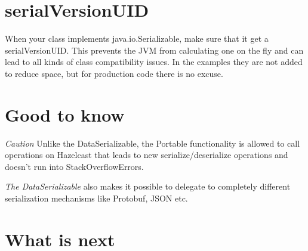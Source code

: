 \section{serialVersionUID} 
When your class implements java.io.Serializable, make sure that it get a serialVersionUID. This prevents the JVM from calculating one on the fly and can lead to all kinds of class compatibility issues. In the examples they are not added to reduce space, but for production code there is no excuse.

\section{Good to know}

\emph{Caution}  Unlike the DataSerializable, the Portable functionality is allowed to call operations on Hazelcast that leads to new serialize/deserialize operations and doesn't run into StackOverflowErrors.

\emph{The DataSerializable} also makes it possible to delegate to completely different serialization mechanisms like Protobuf, JSON etc.

\section{What is next}
